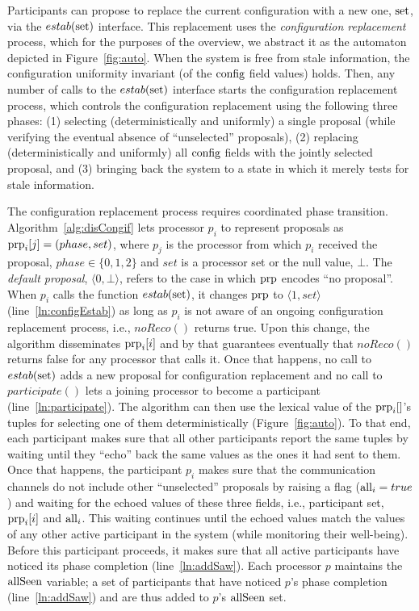 \documentclass[11pt]{article}
\begin{document}
Participants can propose to replace the current configuration with a new one, $\textnormal{set}$, via the $estab(\textnormal{set})$ interface. This replacement uses the {\em configuration replacement} process, which for the purposes of the overview, we abstract it as the automaton depicted in Figure~\ref{fig:auto}. When the system is free from stale information, the configuration uniformity invariant (of the $\textnormal{config}$ field values) holds. Then, any number of calls to the $estab(\textnormal{set})$ interface starts the configuration replacement process, which controls the configuration replacement using the following three phases: (1) selecting (deterministically and uniformly) a single proposal (while verifying the eventual absence of ``unselected'' proposals), (2) replacing (deterministically and uniformly) all $\textnormal{config}$ fields with the jointly selected proposal, and (3) bringing back the system to a state in which it merely tests for stale information. 


The configuration replacement process requires coordinated phase transition.
Algorithm~\ref{alg:disCongif} lets processor $p_i$ to represent proposals as $\textnormal{prp}_i[j]=(phase, set)$, where $p_j$ is the processor from which $p_i$ received the proposal, $phase \in \{0,1, 2\}$ and $set$ is a processor set or the null value, $\bot$. The \emph{default proposal}, $\langle 0, \bot \rangle$, refers to the case in which $\textnormal{prp}$ encodes ``no proposal''. 
When $p_i$ calls the function $estab(\textnormal{set})$, it changes $\textnormal{prp}$ to $\langle 1, set \rangle$ (line~\ref{ln:configEstab}) as long as $p_i$ is not aware of an ongoing configuration replacement process, i.e., $noReco()$ returns true. Upon this change, the algorithm disseminates $\textnormal{prp}_i[i]$ and by that guarantees eventually that $noReco()$ returns false for any processor that calls it. Once that happens, no call to $estab(\textnormal{set})$ adds a new proposal for configuration replacement and no call to $participate()$ lets a joining processor to become a participant (line~\ref{ln:participate}). The algorithm can then use the lexical value of the $\textnormal{prp}_i[]$'s tuples for selecting one of them deterministically (Figure~\ref{fig:auto}). To that end, each participant makes sure that all other participants report the same tuples by waiting until they ``echo'' back the same values as the ones it had sent to them. Once that happens, the participant $p_i$ makes sure that the communication channels do not include other ``unselected'' proposals by raising a flag ($\textnormal{all}_i=true$) and waiting for the echoed values of these three fields, i.e., participant set, $\textnormal{prp}_i[i]$ and $\textnormal{all}_i$. This waiting continues until the echoed values match the values of any other active participant in the system (while monitoring their well-being). Before this participant proceeds, it makes sure that all active participants have noticed its phase completion (line~\ref{ln:addSaw}). Each processor $p$ maintains the $\textnormal{allSeen}$ variable; a set of participants that have noticed $p$'s phase completion (line~\ref{ln:addSaw}) and are thus added to $p$'s $\textnormal{allSeen}$ set.
\end{document}
